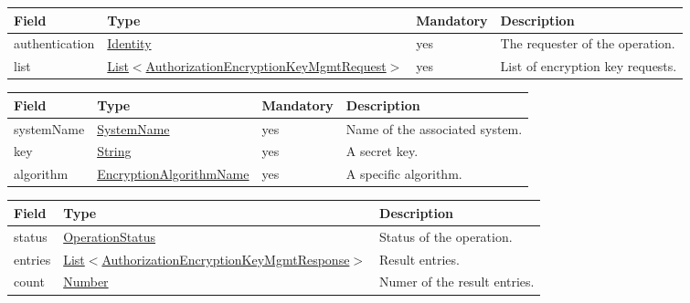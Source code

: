 \documentclass[a4paper]{arrowhead}
\newcommand{\pref}[1]{{\textcolor{ArrowheadGrey}{\hyperref[sec:model:primitives:#1]{#1}}}}
\begin{document}
\clearpage


\begin{table}[ht!]
\begin{tabularx}{\textwidth}{| p{2.5cm} | p{7.5cm} | p{2cm} | X |} \hline
\rowcolor{gray!33} Field & Type & Mandatory & Description \\ \hline
authentication & \hyperref[sec:model:Identity]{Identity} & yes & The requester of the operation. \\ \hline
list & \pref{List}$<$\hyperref[sec:model:AuthorizationEncryptionKeyMgmtRequest]{AuthorizationEncryptionKeyMgmtRequest}$>$ & yes & List of encryption key requests. \\ \hline
\end{tabularx}
\end{table}


\begin{table}[ht!]
\begin{tabularx}{\textwidth}{| p{3cm} | p{4.5cm} | p{2cm} | X |} \hline
\rowcolor{gray!33} Field & Type & Mandatory & Description \\ \hline
systemName & \pref{SystemName} & yes & Name of the associated system. \\ \hline
key & \pref{String} & yes & A secret key. \\ \hline
algorithm & \pref{EncryptionAlgorithmName} & yes & A specific algorithm. \\ \hline
\end{tabularx}
\end{table}


\begin{table}[ht!]
\begin{tabularx}{\textwidth}{| p{2cm} | p{7.8cm} | X |} \hline
\rowcolor{gray!33} Field & Type & Description \\ \hline
status & \pref{OperationStatus} & Status of the operation. \\ \hline
entries & \pref{List}$<$\hyperref[sec:model:AuthorizationEncryptionKeyMgmtResponse]{AuthorizationEncryptionKeyMgmtResponse}$>$ & Result entries. \\ \hline
count & \pref{Number} & Numer of the result entries. \\ \hline
\end{tabularx}
\end{table}
\end{document}
